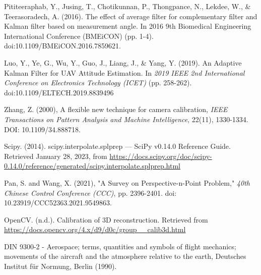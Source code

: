 \begin{flushleft}
\begin{thebibliography}{19}

 Pititeeraphab, Y., Jusing, T., Chotikunnan, P., Thongpance, N., Lekdee, W., \& Teerasoradech, A. (2016). The effect of average filter for complementary filter and Kalman filter based on measurement angle. In 2016 9th Biomedical Engineering International Conference (BMEiCON) (pp. 1-4). doi:10.1109/BMEiCON.2016.7859621.

 Luo, Y., Ye, G., Wu, Y., Guo, J., Liang, J., \& Yang, Y. (2019). An Adaptive Kalman Filter for UAV Attitude Estimation. In \textit{2019 IEEE 2nd International Conference on Electronics Technology (ICET)} (pp. 258-262). doi:10.1109/ELTECH.2019.8839496


Zhang, Z. (2000), A flexible new technique for camera calibration, \textit{IEEE Transactions on Pattern Analysis and Machine Intelligence}, 22(11), 1330-1334. DOI: 10.1109/34.888718.





Scipy. (2014). scipy.interpolate.splprep — SciPy v0.14.0 Reference Guide. Retrieved January 28, 2023, from \url{https://docs.scipy.org/doc/scipy-0.14.0/reference/generated/scipy.interpolate.splprep.html}


 Pan, S. and Wang, X. (2021), "A Survey on Perspective-n-Point Problem," \textit{40th Chinese Control Conference (CCC)}, pp. 2396-2401. doi: 10.23919/CCC52363.2021.9549863.

 OpenCV. (n.d.). Calibration of 3D reconstruction. Retrieved from \url{https://docs.opencv.org/4.x/d9/d0c/group__calib3d.html}


 DIN 9300-2 - Aerospace; terms, quantities and symbols of flight mechanics; movements of the aircraft and the atmosphere relative to the earth, Deutsches Institut für Normung, Berlin (1990).


\end{thebibliography}
\end{flushleft}
